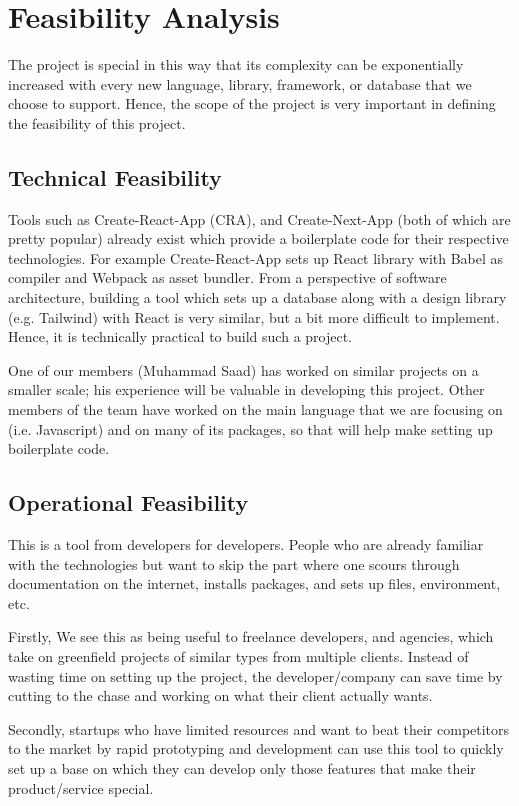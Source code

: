 \section{Feasibility Analysis}
The project is special in this way that its complexity can be exponentially increased with every new language, library, framework, or database that we choose to support. Hence, the scope of the project is very important in defining the feasibility of this project.

\subsection{Technical Feasibility}
Tools such as Create-React-App (CRA), and Create-Next-App  (both of which are pretty popular) already exist which provide a boilerplate code for their respective technologies. For example Create-React-App sets up React library with Babel as compiler and Webpack as asset bundler. From a perspective of software architecture, building a tool which sets up a database along with a design library (e.g. Tailwind) with React is very similar, but a bit more difficult to implement. Hence, it is technically practical to build such a project.

One of our members (Muhammad Saad) has worked on similar projects on a smaller scale; his experience will be valuable in developing this project. Other members of the team have worked on the main language that we are focusing on (i.e. Javascript) and on many of its packages, so that will help make setting up boilerplate code.

\subsection{Operational Feasibility}
This is a tool from developers for developers. People who are already familiar with the technologies but want to skip the part where one scours through documentation on the internet, installs packages, and sets up files, environment, etc.

Firstly, We see this as being useful to freelance developers, and agencies, which take on greenfield projects of similar types from multiple clients. Instead of wasting time on setting up the project, the developer/company can save time by cutting to the chase and working on what their client actually wants.

Secondly, startups who have limited resources and want to beat their competitors to the market by rapid prototyping and development can use this tool to quickly set up a base on which they can develop only those features that make their product/service special.

